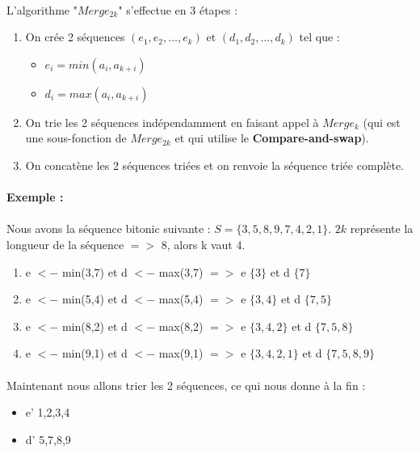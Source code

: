 \paragraph{}
L'algorithme "\textbf{$Merge_{2k}$}" s'effectue en 3 étapes :
\begin{enumerate}
\item On crée 2 séquences $(e_1, e_2,...,e_k)$ et $(d_1, d_2, ..., d_k)$ tel que :
\begin{itemize}
\item $e_{i} = min(a_{i}, a_{k+i})$
\item $d_{i} = max(a_{i}, a_{k+i})$
\end{itemize}
\item On trie les 2 séquences indépendamment en faisant appel à \textit{$Merge_{k}$} (qui est une sous-fonction de \textbf{$Merge_{2k}$} et qui utilise le \textbf{Compare-and-swap}).
\item On concatène les 2 séquences triées et on renvoie la séquence triée complète.
\end{enumerate}

\paragraph{}
\textbf{Exemple :}
\paragraph{}
Nous avons la séquence bitonic suivante : $S = \{3, 5, 8, 9, 7, 4, 2, 1\}$. $2k$ représente la longueur de la séquence $=>$ 8, alors k vaut 4. 
\begin{enumerate}
\item e $<-$ min(3,7) et d $<-$ max(3,7) $=>$ e $\{3\}$ et d $\{7\}$
\item e $<-$ min(5,4) et d $<-$ max(5,4) $=>$ e $\{3,4\}$ et d $\{7,5\}$
\item e $<-$ min(8,2) et d $<-$ max(8,2) $=>$ e $\{3,4,2\}$ et d $\{7,5,8\}$
\item e $<-$ min(9,1) et d $<-$ max(9,1) $=>$ e $\{3,4,2,1\}$ et d $\{7,5,8,9\}$
\end{enumerate}
\paragraph{}
Maintenant nous allons trier les 2 séquences, ce qui nous donne à la fin :
\begin{itemize}
\item e' {1,2,3,4}
\item d' {5,7,8,9}
\end{itemize}
